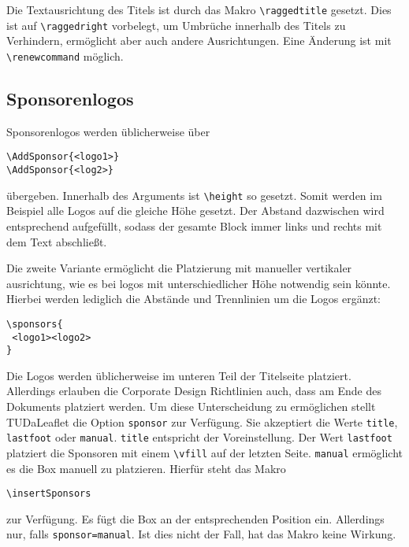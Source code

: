 \documentclass[
	color=3c,
	]{tudaleaflet}
\begin{document}
Die Textausrichtung des Titels ist durch das Makro \verb+\raggedtitle+ gesetzt. Dies ist auf \verb+\raggedright+ vorbelegt, um Umbrüche innerhalb des Titels zu Verhindern, ermöglicht aber auch andere Ausrichtungen. Eine Änderung ist mit \verb+\renewcommand+ möglich.

\subsection{Sponsorenlogos}
Sponsorenlogos werden üblicherweise über
\begin{verbatim}
\AddSponsor{<logo1>}
\AddSponsor{<log2>}
\end{verbatim}
übergeben. Innerhalb des Arguments ist \verb+\height+ so gesetzt. Somit werden im Beispiel alle Logos auf die gleiche Höhe gesetzt. Der Abstand dazwischen wird entsprechend aufgefüllt, sodass der gesamte Block immer links und rechts mit dem Text abschließt.

Die zweite Variante ermöglicht die Platzierung mit manueller vertikaler ausrichtung, wie es bei logos mit unterschiedlicher Höhe notwendig sein könnte. Hierbei werden lediglich die Abstände und Trennlinien um die Logos ergänzt:

\begin{verbatim}
\sponsors{
 <logo1><logo2>
}
\end{verbatim}

Die Logos werden üblicherweise im unteren Teil der Titelseite platziert. Allerdings erlauben die Corporate Design Richtlinien auch, dass am Ende des Dokuments platziert werden.
Um diese Unterscheidung zu ermöglichen stellt TUDaLeaflet die Option \verb+sponsor+ zur Verfügung. Sie akzeptiert die Werte \verb+title+, \verb+lastfoot+ oder \verb+manual+.
\verb+title+ entspricht der Voreinstellung. Der Wert \verb+lastfoot+ platziert die Sponsoren mit einem \verb+\vfill+ auf der letzten Seite. \verb+manual+ ermöglicht es die Box manuell zu platzieren. Hierfür steht das Makro
\begin{verbatim}
\insertSponsors
\end{verbatim}
zur Verfügung. Es fügt die Box an der entsprechenden Position ein. Allerdings nur, falls \verb+sponsor=manual+. Ist dies nicht der Fall, hat das Makro keine Wirkung.


\printbibliography
\end{document}
